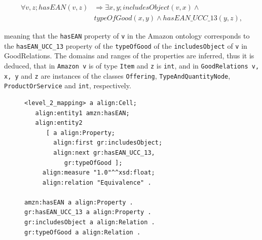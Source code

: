 \begin{equation*} \label{eq}
\begin{split}
\forall{v,z}; hasEAN(v,z) & \Longrightarrow \exists{x, y}; includesObject(v,x) \wedge \\
&typeOfGood(x,y) \wedge hasEAN\_UCC\_13(y,z),
\end{split}
\end{equation*}

meaning that the \texttt{hasEAN} property of \texttt{v} in the Amazon ontology corresponds to the \texttt{hasEAN\_UCC\_13} property of the \texttt{typeOfGood} of the \texttt{includesObject} of \texttt{v} in GoodRelations. The domains and ranges of the properties are inferred, thus it is deduced, that in \texttt{Amazon v} is of type \texttt{Item} and \texttt{z} is \texttt{int}, and in \texttt{GoodRelations v, x, y} and \texttt{z} are instances of the classes \texttt{Offering}, \texttt{TypeAndQuantityNode}, \texttt{ProductOrService} and \texttt{int}, respectively.

\begin{figure}[ht]
\lstset{caption=Fragment of the Amazon--GoodRelations mapping, label=listing_gr_a}
\lstset{language=turtle}
\begin{lstlisting}
<level_2_mapping> a align:Cell;
   align:entity1 amzn:hasEAN;
   align:entity2 
      [ a align:Property;
        align:first gr:includesObject;
        align:next gr:hasEAN_UCC_13,
           gr:typeOfGood ];
     align:measure "1.0"^^xsd:float;
     align:relation "Equivalence" .

amzn:hasEAN a align:Property .
gr:hasEAN_UCC_13 a align:Property .
gr:includesObject a align:Relation .
gr:typeOfGood a align:Relation .
\end{lstlisting}
\end{figure}


